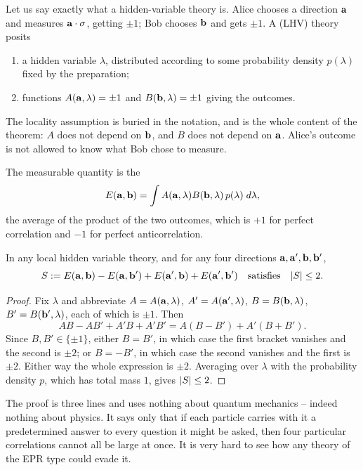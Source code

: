 \documentclass[a4paper]{scrartcl}
\begin{document}
Let us say exactly what a hidden-variable theory is. Alice chooses a direction $\mathbf{a}$ and measures $\mathbf{a} \cdot \mathbf{\sigma}$, getting $\pm1$; Bob chooses $\mathbf{b}$ and gets $\pm1$. A  (LHV) theory posits
\begin{enumerate}[label=(\roman*)]
    \item a hidden variable $\lambda$, distributed according to some probability density $p(\lambda)$ fixed by the preparation;
    \item functions $A(\mathbf{a}, \lambda) = \pm 1$ and $B(\mathbf{b}, \lambda) = \pm 1$ giving the outcomes.
\end{enumerate}
The locality assumption is buried in the notation, and is the whole content of the theorem: $A$ does not depend on $\mathbf{b}$, and $B$ does not depend on $\mathbf{a}$. Alice's outcome is not allowed to know what Bob chose to measure.

The measurable quantity is the 
$$
E(\mathbf{a}, \mathbf{b}) = \int A(\mathbf{a},\lambda)B(\mathbf{b}, \lambda)\,p(\lambda)\; d\lambda,
$$
the average of the product of the two outcomes, which is $+1$ for perfect correlation and $-1$ for perfect anticorrelation.

\begin{theorem}
    In any local hidden variable theory, and for any four directions $\mathbf{a}, \mathbf{a}', \mathbf{b}, \mathbf{b}'$,
    $$
    S := E(\mathbf{a}, \mathbf{b}) - E(\mathbf{a}, \mathbf{b}') + E(\mathbf{a}', \mathbf{b}) + E(\mathbf{a}', \mathbf{b}') \quad \text{satisfies} \quad \lvert S\rvert \leq 2.
    $$
\end{theorem}
\begin{proof}
    Fix $\lambda$ and abbreviate $A = A(\mathbf{a},\lambda)$, $A' = A(\mathbf{a}',\lambda)$, $B = B(\mathbf{b},\lambda)$, $B' = B(\mathbf{b}',\lambda)$, each of which is $\pm1$. Then
    $$
    AB - AB' + A'B + A'B' = A\left( B - B' \right) + A'\left( B + B' \right).
    $$
    Since $B, B' \in \{\pm1\}$, either $B = B'$, in which case the first bracket vanishes and the second is $\pm2$; or $B = -B'$, in which case the second vanishes and the first is $\pm2$. Either way the whole expression is $\pm2$. Averaging over $\lambda$ with the probability density $p$, which has total mass $1$, gives $\lvert S\rvert\leq2$.
\end{proof}

The proof is three lines and uses nothing about quantum mechanics -- indeed nothing about physics. It says only that if each particle carries with it a predetermined answer to every question it might be asked, then four particular correlations cannot all be large at once. It is very hard to see how any theory of the EPR type could evade it.
\end{document}
